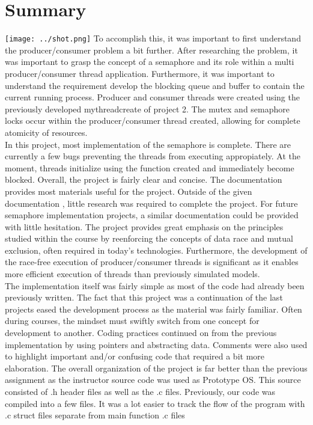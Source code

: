 \documentclass[11pt]{article} %
\newcommand{\tab}{\hspace*{2em}}
\begin{document}
\section{Summary}

\texttt{[image: ../shot.png]}
\tab To accomplish this, it was important to first understand the producer/consumer problem a bit further.  After researching the problem, it was important to grasp the concept of a semaphore and its role within a multi producer/consumer thread application.  Furthermore, it was important to understand the requirement develop the blocking queue and buffer to contain the current running process.  Producer and consumer threads were created using the previously developed mythread\textunderscore create of project 2.  The mutex and semaphore locks occur within the producer/consumer thread created, allowing for complete atomicity of resources.\\
\tab In this project, most implementation of the semaphore is complete.  There are currently a few bugs preventing the threads from executing appropiately.  At the moment, threads initialize using the  function created  and immediately become blocked.
\tab Overall, the project is fairly clear and concise.  The documentation provides most materials useful for the project.  Outside of the given documentation , little research was required to complete the project.  For future semaphore implementation projects, a similar documentation could be provided with little hesitation.  The project provides great emphasis on the principles studied within the course by reenforcing the concepts of data race and mutual exclusion, often required in today's technologies.   Furthermore, the development of the race-free execution of producer/consumer threads is significant as it enables more efficient execution of threads than previously simulated models.  \\
\tab The implementation itself was fairly simple as most of the code had already been previously written.  The fact that this project was a continuation of the last projects eased the development process as the material was fairly familiar.  Often during courses, the mindset must swiftly switch from one concept for development to another.  Coding practices continued on from the previous implementation by using pointers and abstracting data.  Comments were also used to highlight important and/or confusing code that required a bit more elaboration.  The overall organization of the project is far better than the previous assignment as the instructor source code was used as Prototype OS.  This source consisted of .h header files as well as the .c files.  Previously, our code was compiled into a few files.  It was a lot easier to track the flow of the program with .c struct files separate from main function .c files 
\end{document}
